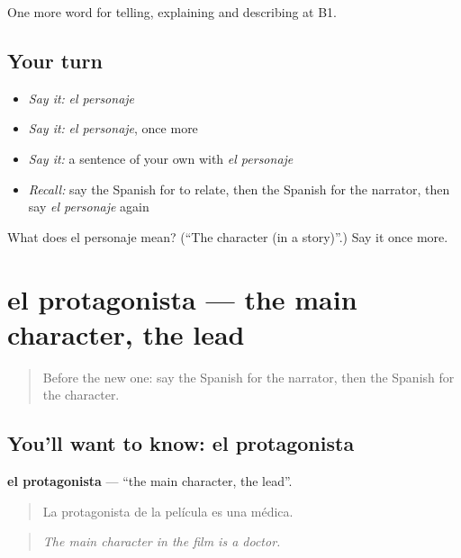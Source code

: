 \begin{grammarlens}[title={What you've built}]
One more word for telling, explaining and describing at B1.
\end{grammarlens}

\subsection*{Your turn}
\begin{itemize}
\raggedright
  \item \emph{Say it:} \emph{el personaje}
  \item \emph{Say it:} \emph{el personaje}, once more
  \item \emph{Say it:} a sentence of your own with \emph{el personaje}
  \item \emph{Recall:} say the Spanish for to relate, then the Spanish for the narrator, then say \emph{el personaje} again
\end{itemize}

\begin{tcolorbox}[breakable,colback=teal!4,colframe=teal!35!black,title={Before you move on}]
What does el personaje mean? (\textquotedblleft{}The character (in a story)\textquotedblright{}.) Say it once more.
\end{tcolorbox}
\section[el protagonista]{el protagonista — the main character, the lead}

\label{lesson:ES-C564-protagonista}



\begin{quote}
Before the new one: say the Spanish for the narrator, then the Spanish for the character.
\end{quote}

\subsection*{You'll want to know: el protagonista}
\textbf{el protagonista} — \textquotedblleft{}the main character, the lead\textquotedblright{}.

\begin{quote}
La protagonista de la película es una médica.
\end{quote}

\begin{quote}
\emph{The main character in the film is a doctor.}
\end{quote}

